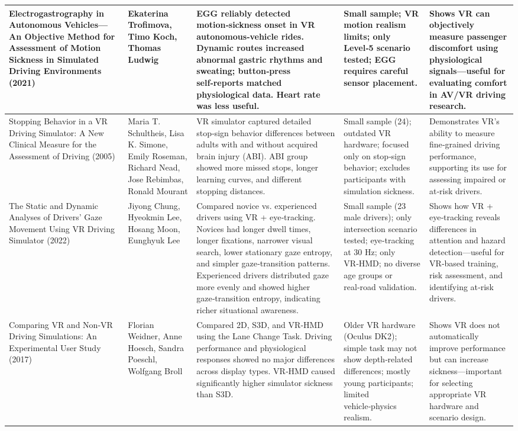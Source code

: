 {\begin{longtable}{|p{}|p{}|>{\raggedright\arraybackslash}p{}|>{\raggedright\arraybackslash}p{}|>{\raggedright\arraybackslash}p{}|}
Electrogastrography in Autonomous Vehicles—An Objective Method for Assessment of Motion Sickness in Simulated Driving Environments (2021)~\cite{Trofimova2021} & Ekaterina Trofimova, Timo Koch, Thomas Ludwig & EGG reliably detected motion‑sickness onset in VR autonomous‑vehicle rides. Dynamic routes increased abnormal gastric rhythms and sweating; button‑press self‑reports matched physiological data. Heart rate was less useful. & Small sample; VR motion realism limits; only Level‑5 scenario tested; EGG requires careful sensor placement. & Shows VR can objectively measure passenger discomfort using physiological signals—useful for evaluating comfort in AV/VR driving research. \\ \hline
Stopping Behavior in a VR Driving Simulator: A New Clinical Measure for the Assessment of Driving (2005)~\cite{Schultheis2005} & Maria T. Schultheis, Lisa K. Simone, Emily Roseman, Richard Nead, Jose Rebimbas, Ronald Mourant & VR simulator captured detailed stop‑sign behavior differences between adults with and without acquired brain injury (ABI). ABI group showed more missed stops, longer learning curves, and different stopping distances. & Small sample (24); outdated VR hardware; focused only on stop‑sign behavior; excludes participants with simulation sickness. & Demonstrates VR’s ability to measure fine‑grained driving performance, supporting its use for assessing impaired or at‑risk drivers. \\ \hline
The Static and Dynamic Analyses of Drivers’ Gaze Movement Using VR Driving Simulator (2022) & Jiyong Chung, Hyeokmin Lee, Hosang Moon, Eunghyuk Lee & Compared novice vs. experienced drivers using VR + eye‑tracking. Novices had longer dwell times, longer fixations, narrower visual search, lower stationary gaze entropy, and simpler gaze‑transition patterns. Experienced drivers distributed gaze more evenly and showed higher gaze‑transition entropy, indicating richer situational awareness. & Small sample (23 male drivers); only intersection scenario tested; eye‑tracking at 30 Hz; only VR‑HMD; no diverse age groups or real‑road validation. & Shows how VR + eye‑tracking reveals differences in attention and hazard detection—useful for VR‑based training, risk assessment, and identifying at‑risk drivers. \\ \hline
Comparing VR and Non‑VR Driving Simulations: An Experimental User Study (2017)~\cite{Weidner2017} & Florian Weidner, Anne Hoesch, Sandra Poeschl, Wolfgang Broll & Compared 2D, S3D, and VR‑HMD using the Lane Change Task. Driving performance and physiological responses showed no major differences across display types. VR‑HMD caused significantly higher simulator sickness than S3D. & Older VR hardware (Oculus DK2); simple task may not show depth‑related differences; mostly young participants; limited vehicle‑physics realism. & Shows VR does not automatically improve performance but can increase sickness—important for selecting appropriate VR hardware and scenario design. \\ \hline

\end{longtable}}
